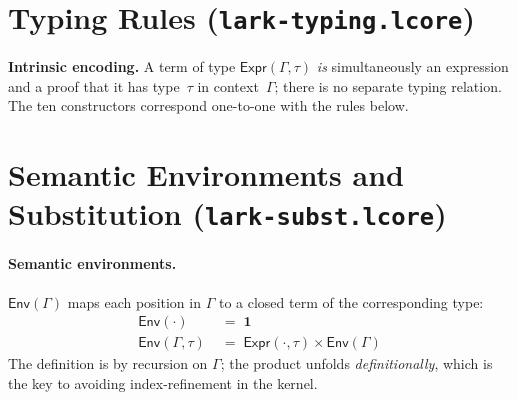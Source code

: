 \documentclass[10pt,a4paper]{article}
\newcommand{\TInt}{\mathsf{Int}}
\newcommand{\TFlt}{\mathsf{Float}}
\newcommand{\TBool}{\mathsf{Bool}}
\newcommand{\TStr}{\mathsf{Str}}
\newcommand{\TUnit}{\mathsf{Unit}}
\newcommand{\hasty}[3]{#1 \vdash #2 : #3}       %
\newcommand{\inctx}[2]{#1 \ni #2}               %
\newcommand{\SemEnv}[1]{\mathsf{Env}(#1)}
\newcommand{\klet}{\mathbf{let}}
\newcommand{\kin}{\mathbf{in}}
\newcommand{\kif}{\mathbf{if}}
\newcommand{\kthen}{\mathbf{then}}
\newcommand{\kelse}{\mathbf{else}}
\newcommand{\lfile}[1]{\texttt{#1}}
\theoremstyle{plain}
\theoremstyle{definition}
\theoremstyle{remark}
\begin{document}
\section{Typing Rules (\lfile{lark-typing.lcore})}
\label{sec:typing}

\noindent\textbf{Intrinsic encoding.}  A term of type
$\mathsf{Expr}(\Gamma,\tau)$ \emph{is} simultaneously an expression and a proof
that it has type~$\tau$ in context~$\Gamma$; there is no separate typing
relation.  The ten constructors correspond one-to-one with the rules below.


\section{Semantic Environments and Substitution (\lfile{lark-subst.lcore})}
\label{sec:subst}

\paragraph{Semantic environments.}
$\SemEnv{\Gamma}$ maps each position in $\Gamma$ to a closed term of the
corresponding type:
\begin{align*}
\SemEnv{\cdot} &\;=\; \mathbf{1}\\
\SemEnv{\Gamma,\tau} &\;=\; \mathsf{Expr}(\cdot,\tau)\times\SemEnv{\Gamma}
\end{align*}
The definition is by recursion on $\Gamma$; the product unfolds \emph{definitionally},
which is the key to avoiding index-refinement in the kernel.
\end{document}
